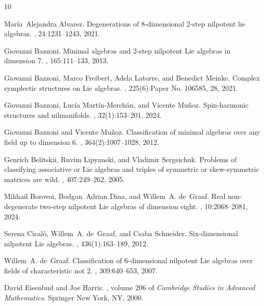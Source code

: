 \documentclass[10pt,reqno]{amsart}
\theoremstyle{definition}
\begin{document}
\newpage



\begin{thebibliography}{10}

María~Alejandra Alvarez.
\newblock Degenerations of 8-dimensional 2-step nilpotent lie algebras.
, 24:1231--1243, 2021.

Giovanni Bazzoni.
\newblock Minimal algebras and 2-step nilpotent {L}ie algebras in dimension 7.
, 165:111--133, 2013.

Giovanni Bazzoni, Marco Freibert, Adela Latorre, and Benedict Meinke.
\newblock Complex symplectic structures on {L}ie algebras.
, 225(6):Paper No. 106585, 28, 2021.

Giovanni Bazzoni, Luc\'ia Mart\'in-Merch\'an, and Vicente Mu\~noz.
\newblock Spin-harmonic structures and nilmanifolds.
, 32(1):153--201, 2024.

Giovanni Bazzoni and Vicente Mu\~{n}oz.
\newblock Classification of minimal algebras over any field up to dimension 6.
, 364(2):1007--1028, 2012.

Genrich Belitskii, Ruvim Lipyanski, and Vladimir Sergeichuk.
\newblock Problems of classifying associative or {L}ie algebras and triples of
  symmetric or skew-symmetric matrices are wild.
, 407:249--262, 2005.

Mikhail Borovoi, Bodgan~Adrian Dina, and Willem~A. de~Graaf.
\newblock Real non-degenerate two-step nilpotent {L}ie algebras of dimension
  eight.
, 10:2068--2081, 2024.

Serena Cical\`o, Willem~A. de~Graaf, and Csaba Schneider.
\newblock Six-dimensional nilpotent {L}ie algebras.
, 436(1):163--189, 2012.

Willem~A. de~Graaf.
\newblock Classification of 6-dimensional nilpotent {L}ie algebras over fields
  of characteristic not 2.
, 309:640--653, 2007.

David Eisenbud and Joe Harris.
, volume 206 of {\em Cambridge Studies
  in Advanced Mathematics}.
\newblock Springer New York, NY, 2000.


\end{thebibliography}
\end{document}
